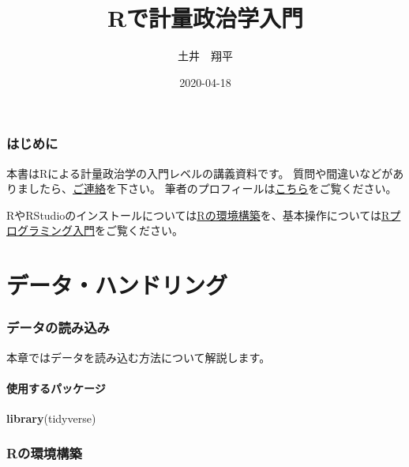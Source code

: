 \documentclass[]{bxjsarticle}
\title{Rで計量政治学入門}
\author{土井　翔平}
\date{2020-04-18}
\newenvironment{Shaded}{\begin{snugshade}}{\end{snugshade}}
\newcommand{\KeywordTok}[1]{\textcolor[rgb]{0.13,0.29,0.53}{\textbf{#1}}}
\newcommand{\NormalTok}[1]{#1}
\begin{document}
\maketitle

{
\setcounter{tocdepth}{2}
\tableofcontents
}
\hypertarget{index}{%
\section*{はじめに}\label{index}}

本書はRによる計量政治学の入門レベルの講義資料です。
質問や間違いなどがありましたら、\href{mailto:shohei.doi0504@gmail.com}{ご連絡}を下さい。
筆者のプロフィールは\href{https://shohei-doi.github.io/}{こちら}をご覧ください。

RやRStudioのインストールについては\protect\hyperlink{install-r}{Rの環境構築}を、基本操作については\protect\hyperlink{intro-r}{Rプログラミング入門}をご覧ください。

\hypertarget{part-ux30c7ux30fcux30bfux30cfux30f3ux30c9ux30eaux30f3ux30b0}{%
\part{データ・ハンドリング}\label{part-ux30c7ux30fcux30bfux30cfux30f3ux30c9ux30eaux30f3ux30b0}}

\hypertarget{data-import}{%
\section{データの読み込み}\label{data-import}}

本章ではデータを読み込む方法について解説します。

\hypertarget{ux4f7fux7528ux3059ux308bux30d1ux30c3ux30b1ux30fcux30b8}{%
\subsection{使用するパッケージ}\label{ux4f7fux7528ux3059ux308bux30d1ux30c3ux30b1ux30fcux30b8}}

\begin{Shaded}
\begin{Highlighting}[]
\KeywordTok{library}\NormalTok{(tidyverse)}
\end{Highlighting}
\end{Shaded}

\hypertarget{appendix-ux88dcux8ad6}{%
\appendix}


\hypertarget{install-r}{%
\section{Rの環境構築}\label{install-r}}
\end{document}
